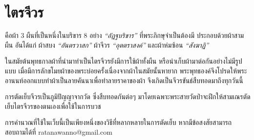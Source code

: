 \chapter{ไตรจีวร}

คือผ้า 3 ผืนที่เป็นหนึ่งในบริขาร 8 อย่าง \emph{``อัฏฐบริขาร''} ที่พระภิกษุจำเป็นต้องมี
ประกอบด้วยผ้าสามผืน อันได้แก่ ผ้าสบง \emph{``อันตรวาสก''} ผ้าจีวร
\emph{``อุตตราสงค์''} และผ้าห่มซ้อน \emph{``สังฆาฏิ''}

ในสมัยต้นพุทธกาลผ้าที่นำมาทำเป็นไตรจีวรยังมีการใช้ผ้าทั้งผืน
หรือนำเก็บผ้ามาต่อกันอย่างไม่มีรูปแบบ
เมื่อมีการลักขโมยผ้าของพระบ่อยครั้งเนื่องจากผ้าในสมัยนั้นหายาก
พระพุทธองค์จึงโปรดให้พระอานนท์ออกแบบทำผ้าเป็นลายคันนาเพื่อทำลายราคาของผ้า
จึงเกิดเป็นจีวรขันธ์สืบทอดมาถึงทุกวันนี้

การตัดเย็บจีวรเป็นภูมิปัญญาจากวัด ซึ่งสืบทอดกันต่อๆ
มาโดยเฉพาะพระสายวัดป่าจะฝึกให้สามเณรตัดเย็บไตรจีวรของตนเองเพื่อใช้ในการบวช

การคำนวณที่ใช้ในเว็บนี้เป็นเพียงหนึ่งของวิธีที่หลากหลายในการตัดเย็บ
หากมีข้อสงสัยสามารถสอบถามได้ที่ ratanawanno@gmail.com

